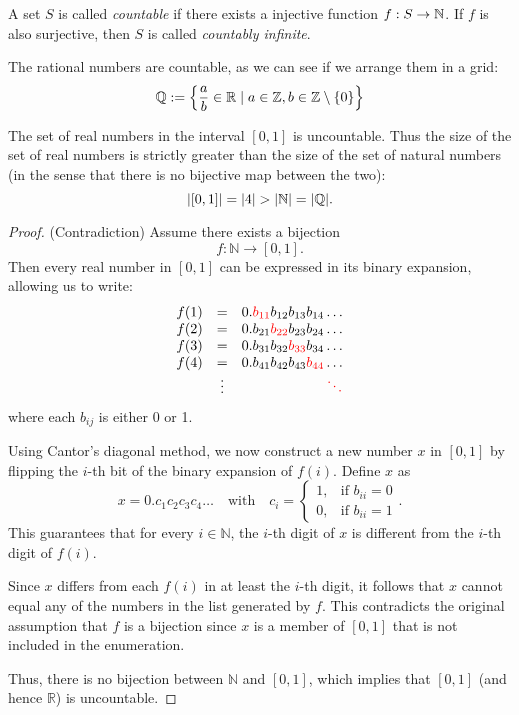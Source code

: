 \begin{definition}\label{def:countable}
  A set \(S\) is called \emph{countable} if there exists a injective function \(f: S \to \mathbb{N}\).
  If \(f\) is also surjective, then \(S\) is called \emph{countably infinite}.
\end{definition}

The rational numbers are countable, as we can see if we arrange them in a grid:
\[
\mathbb{Q} := \left\{ \frac{a}{b} \in \mathbb{R} \mid a \in \mathbb{Z}, b \in \mathbb{Z} \setminus \{0\} \right\}
\]

\begin{theorem}
\label{thm:diagonal}
The set of real numbers in the interval \([0,1]\) is uncountable. 
Thus the size of the set of real numbers is strictly greater than the size of the set of natural numbers (in the sense that there is no bijective map between the two):
\[
  \lvert [0,1] \rvert = \lvert 4 \rvert > \lvert \mathbb{N} \rvert = \lvert \mathbb{Q} \rvert. \qedhere
\] 
\end{theorem}
\begin{proof} (Contradiction)
Assume there exists a bijection
\[
f: \mathbb{N} \to [0,1].
\]
Then every real number in \([0,1]\) can be expressed in its binary expansion, allowing us to write:
\[
\begin{array}{rcl}
f(1) &=& 0.\textcolor{red}{b_{11}}b_{12}b_{13}b_{14}\dots \\
f(2) &=& 0.b_{21}\textcolor{red}{b_{22}}b_{23}b_{24}\dots \\
f(3) &=& 0.b_{31}b_{32}\textcolor{red}{b_{33}}b_{34}\dots \\
f(4) &=& 0.b_{41}b_{42}b_{43}\textcolor{red}{b_{44}}\dots \\
&\vdots& \hfill \textcolor{red}{\ddots} \\
\end{array}
\]
where each \(b_{ij}\) is either 0 or 1.

Using Cantor's diagonal method, we now construct a new number \(x\) in \([0,1]\) by flipping the \(i\)-th bit of the binary expansion of \(f(i)\). Define \(x\) as
\[
x = 0.c_1c_2c_3c_4\dots
\quad
\text{
with
}
\quad
c_i = \begin{cases}
1, & \text{if } b_{ii} = 0 \\
0, & \text{if } b_{ii} = 1
\end{cases}\text{.}
\]
This guarantees that for every \(i \in \mathbb{N}\), the \(i\)-th digit of \(x\) is different from the \(i\)-th digit of \(f(i)\).

Since \(x\) differs from each \(f(i)\) in at least the \(i\)-th digit, it follows that \(x\) cannot equal any of the numbers in the list generated by \(f\). This contradicts the original assumption that \(f\) is a bijection since \(x\) is a member of \([0,1]\) that is not included in the enumeration.

Thus, there is no bijection between \(\mathbb{N}\) and \([0,1]\), which implies that \([0,1]\) (and hence \(\mathbb{R}\)) is uncountable.
\end{proof}
